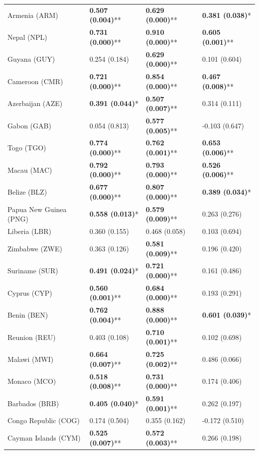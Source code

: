 \begin{longtable}{p{4cm}p{3cm}p{3cm}p{3cm}}
Armenia (ARM) & \textbf{0.507 (0.004)}** & \textbf{0.629 (0.000)}** & \textbf{0.381 (0.038)}* \\
Nepal (NPL) & \textbf{0.731 (0.000)}** & \textbf{0.910 (0.000)}** & \textbf{0.605 (0.001)}** \\
Guyana (GUY) & 0.254 (0.184) & \textbf{0.629 (0.000)}** & 0.101 (0.604) \\
Cameroon (CMR) & \textbf{0.721 (0.000)}** & \textbf{0.854 (0.000)}** & \textbf{0.467 (0.008)}** \\
Azerbaijan (AZE) & \textbf{0.391 (0.044)}* & \textbf{0.507 (0.007)}** & 0.314 (0.111) \\
Gabon (GAB) & 0.054 (0.813) & \textbf{0.577 (0.005)}** & -0.103 (0.647) \\
Togo (TGO) & \textbf{0.774 (0.000)}** & \textbf{0.762 (0.001)}** & \textbf{0.653 (0.006)}** \\
Macau (MAC) & \textbf{0.792 (0.000)}** & \textbf{0.793 (0.000)}** & \textbf{0.526 (0.006)}** \\
Belize (BLZ) & \textbf{0.677 (0.000)}** & \textbf{0.807 (0.000)}** & \textbf{0.389 (0.034)}* \\
Papua New Guinea (PNG) & \textbf{0.558 (0.013)}* & \textbf{0.579 (0.009)}** & 0.263 (0.276) \\
Liberia (LBR) & 0.360 (0.155) & 0.468 (0.058) & 0.103 (0.694) \\
Zimbabwe (ZWE) & 0.363 (0.126) & \textbf{0.581 (0.009)}** & 0.196 (0.420) \\
Suriname (SUR) & \textbf{0.491 (0.024)}* & \textbf{0.721 (0.000)}** & 0.161 (0.486) \\
Cyprus (CYP) & \textbf{0.560 (0.001)}** & \textbf{0.684 (0.000)}** & 0.193 (0.291) \\
Benin (BEN) & \textbf{0.762 (0.004)}** & \textbf{0.888 (0.000)}** & \textbf{0.601 (0.039)}* \\
Reunion (REU) & 0.403 (0.108) & \textbf{0.710 (0.001)}** & 0.102 (0.698) \\
Malawi (MWI) & \textbf{0.664 (0.007)}** & \textbf{0.725 (0.002)}** & 0.486 (0.066) \\
Monaco (MCO) & \textbf{0.518 (0.008)}** & \textbf{0.731 (0.000)}** & 0.174 (0.406) \\
Barbados (BRB) & \textbf{0.405 (0.040)}* & \textbf{0.591 (0.001)}** & 0.262 (0.197) \\
Congo Republic (COG) & 0.174 (0.504) & 0.355 (0.162) & -0.172 (0.510) \\
Cayman Islands (CYM) & \textbf{0.525 (0.007)}** & \textbf{0.572 (0.003)}** & 0.266 (0.198) \\

\end{longtable}
